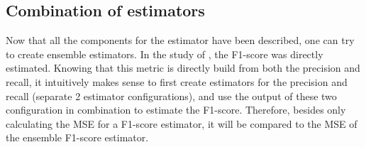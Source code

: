 \subsection{Combination of estimators}
Now that all the components for the estimator have been described, one can try to create ensemble estimators. In the study of \cite{Mahdavi2019-pk}, the F1-score was directly estimated. Knowing that this metric is directly build from both the precision and recall, it intuitively makes sense to first create estimators for the precision and recall (separate 2 estimator configurations), and use the output of these two configuration in combination to estimate the F1-score. Therefore, besides only calculating the MSE for a F1-score estimator, it will be compared to the MSE of the ensemble F1-score estimator.